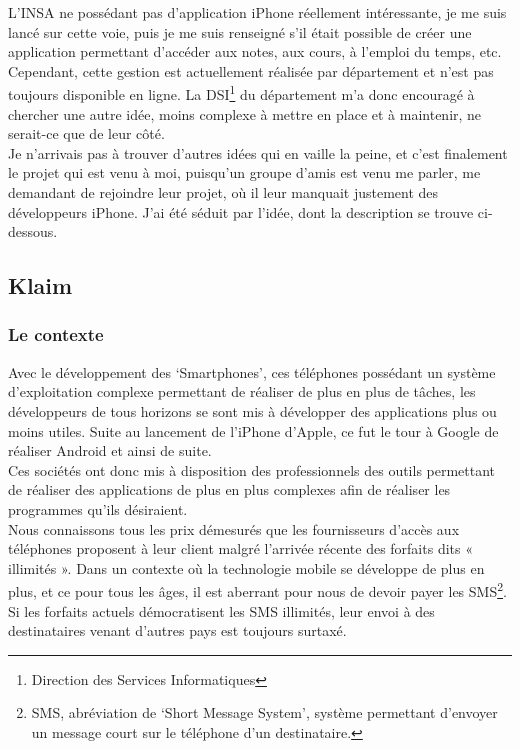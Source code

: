 \documentclass{article}
\begin{document}
	L'INSA ne possédant pas d'application iPhone réellement intéressante, je me suis lancé sur cette voie, puis je me suis renseigné s'il était possible de créer une application permettant d'accéder aux notes, aux cours, à l'emploi du temps, etc. Cependant, cette gestion est actuellement réalisée par département et n'est pas toujours disponible en ligne. La DSI\footnote{Direction des Services Informatiques} du département m'a donc encouragé à chercher une autre idée, moins complexe à mettre en place et à maintenir, ne serait-ce que de leur côté.\\
	
	Je n'arrivais pas à trouver d'autres idées qui en vaille la peine, et c'est finalement le projet qui est venu à moi, puisqu’un groupe d’amis est venu me parler, me demandant de rejoindre leur projet, où il leur manquait justement des développeurs iPhone. J’ai été séduit par l’idée, dont la description se trouve ci-dessous.\\
	
	
\subsection{Klaim}
\subsubsection{Le contexte}
	Avec le développement des ‘Smartphones’, ces téléphones possédant un système d’exploitation complexe permettant de réaliser de plus en plus de tâches, les développeurs de tous horizons se sont mis à développer des applications plus ou moins utiles. Suite au lancement de l’iPhone d’Apple, ce fut le tour à Google de réaliser Android et ainsi de suite.\\
	
	Ces sociétés ont donc mis à disposition des professionnels des outils permettant de réaliser des applications de plus en plus complexes afin de réaliser les programmes qu'ils désiraient. \\
	
	Nous connaissons tous les prix démesurés que les fournisseurs d’accès aux téléphones proposent à leur client malgré l’arrivée récente des forfaits dits « illimités ». Dans un contexte où la technologie mobile se développe de plus en plus, et ce pour tous les âges, il est aberrant  pour nous de devoir payer les SMS\footnote{SMS, abréviation de ‘Short Message System’, système permettant d’envoyer un message court sur le téléphone d’un destinataire.}. Si les forfaits actuels démocratisent les SMS illimités, leur envoi à des destinataires venant d’autres pays est toujours surtaxé. \\
	
\end{document}
